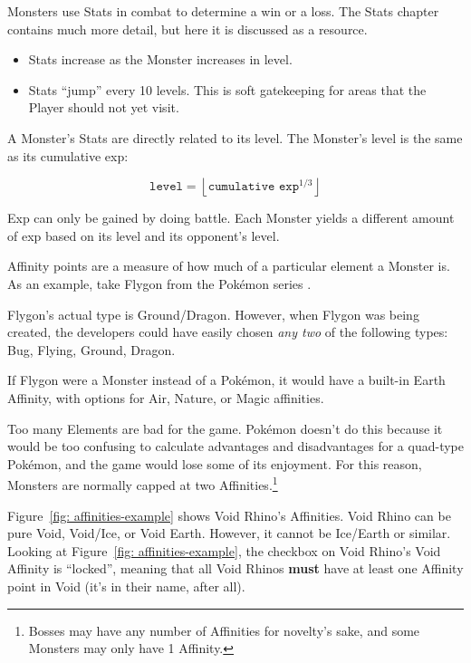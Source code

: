 Monsters use Stats in combat to determine a win or a loss. The Stats chapter contains much more detail, but here it is discussed as a resource.
\begin{itemize}
	\item{Stats increase as the Monster increases in level.}
	\item{Stats ``jump'' every 10 levels. This is soft gatekeeping for areas that the Player should not yet visit.}
\end{itemize}

A Monster's Stats are directly related to its level. The Monster's level is the same as its cumulative exp:

\begin{equation}
	\texttt{level} = \left\lfloor \texttt{cumulative exp}^{1/3} \right\rfloor
\end{equation}

Exp can only be gained by doing battle. Each Monster yields a different amount of exp based on its level and its opponent's level.

Affinity points are a measure of how much of a particular element a Monster is. As an example, take Flygon from the Pok\'{e}mon series \cite{pkmn-website}. 


Flygon's actual type is Ground/Dragon. However, when Flygon was being created, the developers could have easily chosen \textit{any two} of the following types: Bug, Flying, Ground, Dragon. 

If Flygon were a Monster instead of a Pok\'{e}mon, it would have a built-in Earth Affinity, with options for Air, Nature, or Magic affinities.

Too many Elements are bad for the game. Pok\'{e}mon doesn't do this because it would be too confusing to calculate advantages and disadvantages for a quad-type Pok\'{e}mon, and the game would lose some of its enjoyment. For this reason, Monsters are normally capped at two Affinities.\footnote{Bosses may have any number of Affinities for novelty's sake, and some Monsters may only have 1 Affinity.}

Figure~\ref{fig: affinities-example} shows Void Rhino's Affinities. Void Rhino can be pure Void, Void/Ice, or Void Earth. However, it cannot be Ice/Earth or similar. Looking at Figure~\ref{fig: affinities-example}, the checkbox on Void Rhino's Void Affinity is ``locked'', meaning that all Void Rhinos \textbf{must} have at least one Affinity point in Void (it's in their name, after all).

